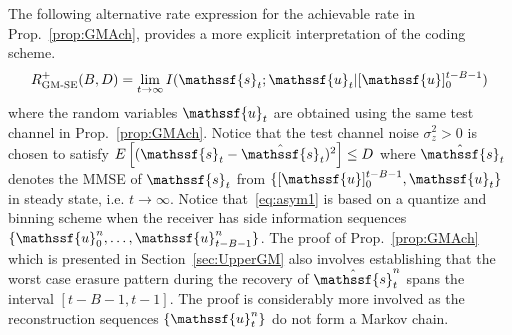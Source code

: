 \documentclass[journal, twocolumn, 10pt]{IEEEtran}
\newtheorem{prop}{Proposition}
\newcommand{\rvs}{{\mathssf{s}}}    %
\newcommand{\rvu}{{\mathssf{u}}}    %
\newcommand{\rvz}{{\mathssf{z}}}    %
\begin{document}


The following alternative rate expression for the achievable rate in Prop.~\ref{prop:GMAch}, provides a more explicit interpretation of the coding scheme.
\begin{align}
R^{+}_{\textrm{GM-SE}}(B,D) =  \lim_{t\to \infty} I(\rvs_{t};\rvu_{t} | [\rvu]_{0}^{t-B-1})\label{eq:asym1}
\end{align} where the random variables $\rvu_t$ are obtained using the same test channel in Prop.~\ref{prop:GMAch}. Notice that the test channel noise $\sigma^2_{z}>0$ is chosen to satisfy $E\left[(\rvs_{t}-\hat{\rvs}_t)^2\right] \le D$ where $\hat{\rvs}_{t}$ denotes the MMSE of $\rvs_{t}$ from $\{[\rvu]_{0}^{t-B-1}, \rvu_{t}\}$ in steady state, i.e. $t\to \infty$. Notice that~\eqref{eq:asym1} is based on a quantize and binning scheme when the receiver has side information sequences $\{\rvu_0^n, \ldots, \rvu_{t-B-1}^n\}$. 
The proof of Prop.~\ref{prop:GMAch} which is presented in Section~\ref{sec:UpperGM} also involves establishing that the worst case erasure pattern during the recovery of  $\hat{\rvs}_t^n$ spans the interval $[t-B-1,t-1]$. The proof is considerably more involved as the reconstruction sequences $\{\rvu_t^n\}$ do not form a Markov chain. 
\end{document}
